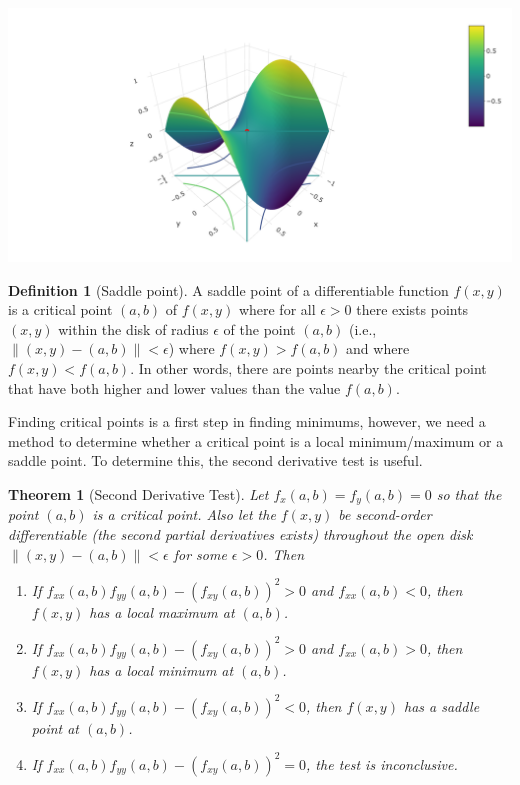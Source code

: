 \documentclass[
]{book}
\newtheorem{theorem}{Theorem}[chapter]
\theoremstyle{definition}
\newtheorem{definition}{Definition}[chapter]
\theoremstyle{definition}
\theoremstyle{definition}
\theoremstyle{definition}
\theoremstyle{remark}
\begin{document}
\includegraphics[width=1\linewidth]{./webshot-images/saddle}

\begin{definition}[Saddle point]
A saddle point of a differentiable function \(f(x, y)\) is a critical point \((a, b)\) of \(f(x, y)\) where for all \(\epsilon > 0\) there exists points \((x, y)\) within the disk of radius \(\epsilon\) of the point \((a, b)\) (i.e., \(\|(x, y) - (a, b)\| < \epsilon\)) where \(f(x, y) > f(a, b)\) and where \(f(x, y) < f(a, b)\). In other words, there are points nearby the critical point that have both higher and lower values than the value \(f(a, b)\).
\end{definition}

Finding critical points is a first step in finding minimums, however, we need a method to determine whether a critical point is a local minimum/maximum or a saddle point. To determine this, the second derivative test is useful.

\begin{theorem}[Second Derivative Test]

Let \(f_x(a, b) = f_y(a, b) = 0\) so that the point \((a, b)\) is a critical point. Also let the \(f(x, y)\) be second-order differentiable (the second partial derivatives exists) throughout the open disk \(\| (x, y) - (a, b)\|< \epsilon\) for some \(\epsilon > 0\). Then

\begin{enumerate}
\def\labelenumi{\arabic{enumi})}
\item
  If \(f_{xx}(a, b)f_{yy}(a, b) - (f_{xy}(a, b))^2 > 0\) and \(f_{xx}(a, b) < 0\), then \(f(x, y)\) has a local maximum at \((a, b)\).
\item
  If \(f_{xx}(a, b)f_{yy}(a, b) - (f_{xy}(a, b))^2 > 0\) and \(f_{xx}(a, b) > 0\), then \(f(x, y)\) has a local minimum at \((a, b)\).
\item
  If \(f_{xx}(a, b)f_{yy}(a, b) - (f_{xy}(a, b))^2 < 0\), then \(f(x, y)\) has a saddle point at \((a, b)\).
\item
  If \(f_{xx}(a, b)f_{yy}(a, b) - (f_{xy}(a, b))^2 = 0\), the test is inconclusive.
\end{enumerate}

\end{theorem}
\end{document}
